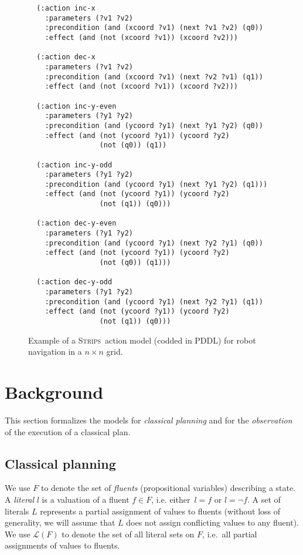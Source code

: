 \documentclass[letterpaper]{article} %
\newcommand{\strips}{\textsc{Strips}}     %
\begin{document}
\begin{figure}
  \begin{tiny}
  \begin{verbatim}
  (:action inc-x
    :parameters (?v1 ?v2)
    :precondition (and (xcoord ?v1) (next ?v1 ?v2) (q0))
    :effect (and (not (xcoord ?v1)) (xcoord ?v2)))

  (:action dec-x
    :parameters (?v1 ?v2)
    :precondition (and (xcoord ?v1) (next ?v2 ?v1) (q1))
    :effect (and (not (xcoord ?v1)) (xcoord ?v2)))

  (:action inc-y-even
    :parameters (?y1 ?y2)
    :precondition (and (ycoord ?y1) (next ?y1 ?y2) (q0))
    :effect (and (not (ycoord ?y1)) (ycoord ?y2)
                 (not (q0)) (q1))

  (:action inc-y-odd
    :parameters (?y1 ?y2)
    :precondition (and (ycoord ?y1) (next ?y1 ?y2) (q1)))
    :effect (and (not (ycoord ?y1)) (ycoord ?y2)
                 (not (q1)) (q0)))

  (:action dec-y-even
    :parameters (?y1 ?y2)
    :precondition (and (ycoord ?y1) (next ?y2 ?y1) (q0))
    :effect (and (not (ycoord ?y1)) (ycoord ?y2)
                 (not (q0)) (q1)))

  (:action dec-y-odd
    :parameters (?y1 ?y2)
    :precondition (and (ycoord ?y1) (next ?y2 ?y1) (q1))
    :effect (and (not (ycoord ?y1)) (ycoord ?y2)
                 (not (q1)) (q0)))
  \end{verbatim}           
  \end{tiny}  
 \caption{\small Example of a \strips\ action model (codded in PDDL) for robot navigation in a $n\times n$ grid.}
\label{fig:model-example}
\end{figure}



\section{Background}
\label{sec:background}
This section formalizes the models for {\em classical planning} and for the {\em observation} of the execution of a classical plan.

\subsection{Classical planning}
We use $F$ to denote the set of {\em fluents} (propositional variables) describing a state. A {\em literal} $l$ is a valuation of a fluent $f\in F$, i.e. either~$l=f$ or $l=\neg f$. A set of literals $L$ represents a partial assignment of values to fluents (without loss of generality, we will assume that $L$ does not assign conflicting values to any fluent). We use $\mathcal{L}(F)$ to denote the set of all literal sets on $F$, i.e.~all partial assignments of values to fluents.
\end{document}
